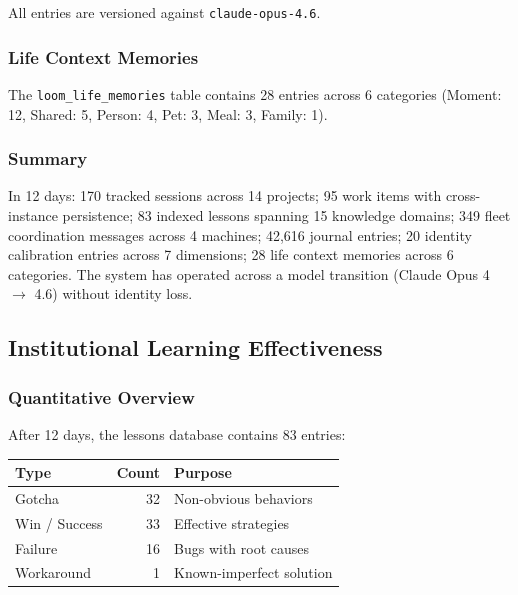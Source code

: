\documentclass[11pt,a4paper]{article}
\begin{document}
All entries are versioned against \texttt{claude-opus-4.6}.


\subsubsection{Life Context Memories}

The \texttt{loom\_life\_memories} table contains 28 entries across 6 categories (Moment: 12, Shared: 5, Person: 4, Pet: 3, Meal: 3, Family: 1).


\subsubsection{Summary}

In 12 days: 170 tracked sessions across 14 projects; 95 work items with cross-instance persistence; 83 indexed lessons spanning 15 knowledge domains; 349 fleet coordination messages across 4 machines; 42,616 journal entries; 20 identity calibration entries across 7 dimensions; 28 life context memories across 6 categories. The system has operated across a model transition (Claude Opus 4 $\to$ 4.6) without identity loss.



\subsection{Institutional Learning Effectiveness}
\label{sec:learning-eval}

\subsubsection{Quantitative Overview}

After 12 days, the lessons database contains 83 entries:

\begin{table}[htbp]
\centering
\small
\begin{tabular}{@{}lrl@{}}
\toprule
\textbf{Type} & \textbf{Count} & \textbf{Purpose} \\
\midrule
Gotcha            & 32 & Non-obvious behaviors \\
Win / Success     & 33 & Effective strategies \\
Failure           & 16 & Bugs with root causes \\
Workaround        & 1  & Known-imperfect solution \\
\bottomrule
\end{tabular}
\end{table}
\end{document}
